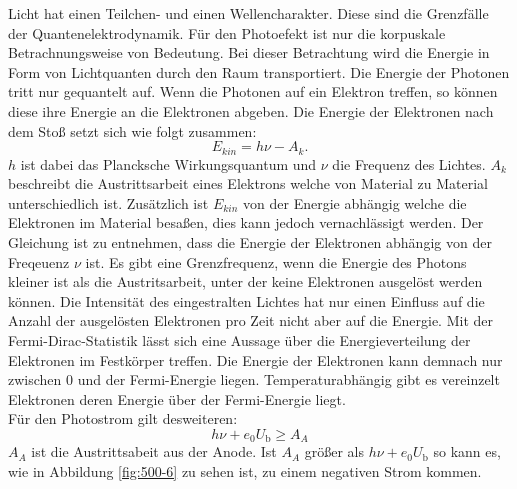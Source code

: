 \FloatBarrier
Licht hat einen Teilchen- und einen Wellencharakter. Diese sind die Grenzfälle der Quantenelektrodynamik. Für den Photoefekt ist nur die korpuskale Betrachnungsweise von Bedeutung. Bei dieser Betrachtung wird die Energie in Form von Lichtquanten durch den Raum transportiert.
Die Energie der Photonen tritt nur gequantelt auf. Wenn die Photonen auf ein Elektron treffen, so können diese ihre Energie an die Elektronen abgeben. Die Energie der Elektronen nach dem Stoß setzt sich wie folgt zusammen:
\begin{equation}
  E_{kin}= h\nu-A_k.
\label{eqn:energieE}
\end{equation}
$h$ ist dabei das Plancksche Wirkungsquantum und $\nu$ die Frequenz des Lichtes. $A_k$ beschreibt die Austrittsarbeit eines Elektrons welche von Material zu Material unterschiedlich ist. Zusätzlich ist $E_{kin}$ von der Energie abhängig welche die Elektronen im Material besaßen, dies kann jedoch vernachlässigt werden.
Der Gleichung ist zu entnehmen, dass die Energie der Elektronen abhängig von der Freqeuenz $\nu$ ist. Es gibt eine Grenzfrequenz, wenn die Energie des Photons kleiner ist als die Austritsarbeit, unter der keine Elektronen ausgelöst werden können. Die Intensität des eingestralten Lichtes hat nur einen Einfluss auf die Anzahl der ausgelösten Elektronen pro Zeit nicht aber auf die Energie. Mit der Fermi-Dirac-Statistik lässt sich eine Aussage über die Energieverteilung der Elektronen im Festkörper treffen. Die Energie der Elektronen kann demnach nur zwischen 0 und der Fermi-Energie liegen. Temperaturabhängig gibt es vereinzelt Elektronen deren Energie über der Fermi-Energie liegt.\\
Für den Photostrom gilt desweiteren:
\begin{equation*}
  h\nu+e_{0}U_{\text{b}} \geq A_A
\end{equation*}
$A_A$ ist die Austrittsabeit aus der Anode. Ist $A_A$ größer als $h\nu+e_0U_{\text{b}}$ so kann es, wie in Abbildung \ref{fig:500-6} zu sehen ist, zu einem negativen Strom kommen.




